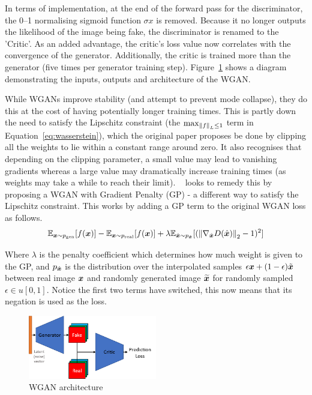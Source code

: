 In terms of implementation, at the end of the forward pass for the discriminator, the 0--1 normalising sigmoid function $\sigma{x}$ is removed.
Because it no longer outputs the likelihood of the image being fake, the discriminator is renamed to the 'Critic'.
As an added advantage, the critic's loss value now correlates with the convergence of the generator.
Additionally, the critic is trained more than the generator (five times per generator training step).
Figure~\ref{fig:architecture} shows a diagram demonstrating the inputs, outputs and architecture of the WGAN\@.

While WGANs improve stability (and attempt to prevent mode collapse), they do this at the cost of having potentially longer training times.
This is partly down the need to satisfy the Lipschitz constraint (the $\max_{\left\lVert f\right\rVert_L \leq 1}$ term in Equation~\ref{eq:wasserstein}), which the original paper proposes be done by clipping all the weights to lie within a constant range around zero.
It also recognises that depending on the clipping parameter, a small value may lead to vanishing gradients whereas a large value may dramatically increase training times (as weights may take a while to reach their limit).
~\cite{gulrajani2017improved} looks to remedy this by proposing a WGAN with Gradient Penalty (GP) - a different way to satisfy the Lipschitz constraint.
This works by adding a GP term to the original WGAN loss as follows.
\begin{equation}
    \mathbb{E}_{{\bm{x}} \sim p_{\textrm{gen}}}[f({\bm{x}})] - \mathbb{E}_{{\bm{x}} \sim p_{\textrm{real}}}[f({\bm{x}})]
    + \lambda \mathbb{E}_{\hat{{\bm{x}}} \sim p_{\hat{{\bm{x}}}}}[(\left\lVert\nabla_{\hat{{\bm{x}}}} D(\hat{{\bm{x}}})\right\rVert_2 - 1)^2]
    \label{eq:wasserstein-gp}
\end{equation}

Where $\lambda$ is the penalty coefficient which determines how much weight is given to the GP\@, and $p_{\hat{{\bm{x}}}}$ is the distribution over the interpolated samples $\epsilon {\bm{x}} + (1 - \epsilon) \tilde{{\bm{x}}}$ between real image ${\bm{x}}$ and randomly generated image $\widetilde{{\bm{x}}}$ for randomly sampled $\epsilon \in u[0, 1]$.
Notice the first two terms have switched, this now means that its negation is used as the loss.

\begin{figure}[h]
    \centering
    \caption{WGAN architecture}
    \label{fig:architecture}
    \includegraphics[width=0.5\textwidth]{figures/architecture}
\end{figure}

